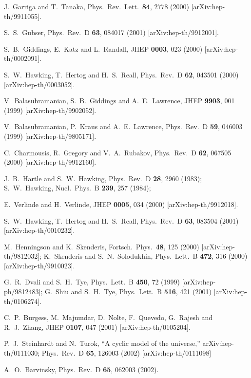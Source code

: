 \documentclass[a4paper,preprint,nofootinbib,
                 showpacs,preprintnumbers,amsmath,amssymb]{revtex4}
\begin{document}
\begin{thebibliography}{99}
J.~Garriga and T.~Tanaka, 
Phys.\ Rev.\ Lett.\  {\bf 84}, 2778 (2000) 
[arXiv:hep-th/9911055]. 
 
S.~S.~Gubser, 
Phys.\ Rev.\ D {\bf 63}, 084017 (2001) 
[arXiv:hep-th/9912001]. 
 
S.~B.~Giddings, E.~Katz and L.~Randall, 
JHEP {\bf 0003}, 023 (2000) 
[arXiv:hep-th/0002091]. 
 
S.~W.~Hawking, T.~Hertog and H.~S.~Reall, 
Phys.\ Rev.\ D {\bf 62}, 043501 (2000) 
[arXiv:hep-th/0003052]. 
 
V.~Balasubramanian, S.~B.~Giddings and A.~E.~Lawrence, 
JHEP {\bf 9903}, 001 (1999) 
[arXiv:hep-th/9902052]. 
 
V.~Balasubramanian, P.~Kraus and A.~E.~Lawrence, 
Phys.\ Rev.\ D {\bf 59}, 046003 (1999) 
[arXiv:hep-th/9805171]. 

C.~Charmousis, R.~Gregory and V.~A.~Rubakov, 
Phys.\ Rev.\ D {\bf 62}, 067505 (2000) 
[arXiv:hep-th/9912160]. 
 
J.~B.~Hartle and S.~W.~Hawking, 
Phys.\ Rev.\ D {\bf 28}, 2960 (1983); 
S.~W.~Hawking, 
Nucl.\ Phys.\ B {\bf 239}, 257 (1984); 
 
E.~Verlinde and H.~Verlinde, 
JHEP {\bf 0005}, 034 (2000) 
[arXiv:hep-th/9912018]. 
 
S.~W.~Hawking, T.~Hertog and H.~S.~Reall, 
Phys.\ Rev.\ D {\bf 63}, 083504 (2001) 
[arXiv:hep-th/0010232]. 
 
M.~Henningson and K.~Skenderis, 
Fortsch.\ Phys.\  {\bf 48}, 125 (2000) 
[arXiv:hep-th/9812032]; 
K.~Skenderis and S.~N.~Solodukhin, 
Phys.\ Lett.\ B {\bf 472}, 316 (2000) 
[arXiv:hep-th/9910023]. 
 
G.~R.~Dvali and S.~H.~Tye, 
Phys.\ Lett.\ B {\bf 450}, 72 (1999) 
[arXiv:hep-ph/9812483]; 
G.~Shiu and S.~H.~Tye, 
Phys.\ Lett.\ B {\bf 516}, 421 (2001) 
[arXiv:hep-th/0106274]. 
 
C.~P.~Burgess, M.~Majumdar, D.~Nolte, F.~Quevedo, G.~Rajesh and R.~J.~Zhang, 
JHEP {\bf 0107}, 047 (2001) 
[arXiv:hep-th/0105204]. 
 
P.~J.~Steinhardt and N.~Turok, 
``A cyclic model of the universe,'' 
arXiv:hep-th/0111030; 
Phys.\ Rev.\ D {\bf 65}, 126003 (2002) 
[arXiv:hep-th/0111098] 
 
A.~O.~Barvinsky, 
Phys.\ Rev.\ D {\bf 65}, 062003 (2002). 
 

\end{thebibliography}
\end{document}
